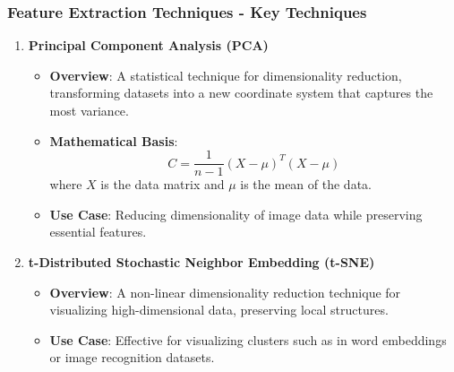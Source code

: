 \documentclass[aspectratio=169]{beamer}
\begin{document}
\begin{frame}[fragile]
    \frametitle{Feature Extraction Techniques - Key Techniques}
    \begin{enumerate}
        \item \textbf{Principal Component Analysis (PCA)}
            \begin{itemize}
                \item \textbf{Overview}: A statistical technique for dimensionality reduction, transforming datasets into a new coordinate system that captures the most variance.
                \item \textbf{Mathematical Basis}:
                    \begin{equation}
                        C = \frac{1}{n-1} (X - \mu)^T (X - \mu)
                    \end{equation}
                    where \(X\) is the data matrix and \(\mu\) is the mean of the data.
                \item \textbf{Use Case}: Reducing dimensionality of image data while preserving essential features.
            \end{itemize}
        
        \item \textbf{t-Distributed Stochastic Neighbor Embedding (t-SNE)}
            \begin{itemize}
                \item \textbf{Overview}: A non-linear dimensionality reduction technique for visualizing high-dimensional data, preserving local structures. 
                \item \textbf{Use Case}: Effective for visualizing clusters such as in word embeddings or image recognition datasets.
            \end{itemize}
    \end{enumerate}
\end{frame}
\end{document}

